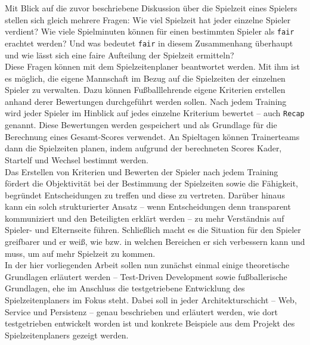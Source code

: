 Mit Blick auf die zuvor beschriebene Diskussion über die Spielzeit eines Spielers 
stellen sich gleich mehrere Fragen: Wie viel Spielzeit hat jeder einzelne Spieler 
verdient? Wie viele Spielminuten können für einen bestimmten Spieler als \texttt{fair} 
erachtet werden? Und was bedeutet \texttt{fair} in diesem Zusammenhang überhaupt und 
wie lässt sich eine faire Aufteilung der Spielzeit ermitteln? \\ 
Diese Fragen können mit dem Spielzeitenplaner beantwortet werden. Mit ihm ist es 
möglich, die eigene Mannschaft im Bezug auf die Spielzeiten der einzelnen Spieler zu 
verwalten. Dazu können Fußballlehrende eigene Kriterien erstellen anhand derer 
Bewertungen durchgeführt werden sollen. Nach jedem Training wird jeder Spieler im 
Hinblick auf jedes einzelne Kriterium bewertet -- auch \texttt{Recap} genannt. 
Diese Bewertungen werden gespeichert und als Grundlage für die Berechnung eines 
Gesamt-Scores verwendet. An Spieltagen können Trainerteams dann die Spielzeiten 
planen, indem aufgrund der berechneten Scores Kader, Startelf und Wechsel bestimmt 
werden. \\ 
Das Erstellen von Kriterien und Bewerten der Spieler nach jedem Training fördert die 
Objektivität bei der Bestimmung der Spielzeiten sowie die Fähigkeit, begründet 
Entscheidungen zu treffen und diese zu vertreten. Darüber hinaus kann ein solch 
strukturierter Ansatz -- wenn Entscheidungen denn transparent kommuniziert und den 
Beteiligten erklärt werden -- zu mehr Verständnis auf Spieler- und Elternseite 
führen. Schließlich macht es die Situation für den Spieler greifbarer und er weiß, 
wie bzw. in welchen Bereichen er sich verbessern kann und muss, um auf mehr Spielzeit 
zu kommen. \\ 
In der hier vorliegenden Arbeit sollen nun zunächst einmal einige theoretische 
Grundlagen erläutert werden -- Test-Driven Development sowie fußballerische 
Grundlagen, ehe im Anschluss die testgetriebene Entwicklung des Spielzeitenplaners 
im Fokus steht. Dabei soll in jeder Architekturschicht -- Web, Service und Persistenz 
-- genau beschrieben und erläutert werden, wie dort testgetrieben entwickelt worden 
ist und konkrete Beispiele aus dem Projekt des Spielzeitenplaners gezeigt werden. 

